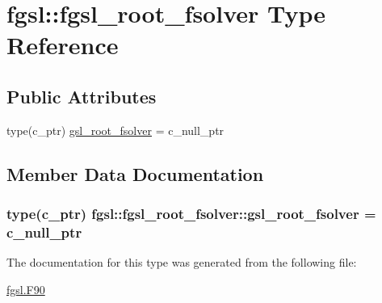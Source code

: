 \hypertarget{structfgsl_1_1fgsl__root__fsolver}{}\section{fgsl\+:\+:fgsl\+\_\+root\+\_\+fsolver Type Reference}
\label{structfgsl_1_1fgsl__root__fsolver}
\subsection*{Public Attributes}
\begin{DoxyCompactItemize}
\item 
type(c\+\_\+ptr) \hyperlink{structfgsl_1_1fgsl__root__fsolver_a04d9a849618a8431b1b923968121a023}{gsl\+\_\+root\+\_\+fsolver} = c\+\_\+null\+\_\+ptr
\end{DoxyCompactItemize}


\subsection{Member Data Documentation}
\hypertarget{structfgsl_1_1fgsl__root__fsolver_a04d9a849618a8431b1b923968121a023}{}
\subsubsection[{gsl\+\_\+root\+\_\+fsolver}]{\setlength{\rightskip}{0pt plus 5cm}type(c\+\_\+ptr) fgsl\+::fgsl\+\_\+root\+\_\+fsolver\+::gsl\+\_\+root\+\_\+fsolver = c\+\_\+null\+\_\+ptr}\label{structfgsl_1_1fgsl__root__fsolver_a04d9a849618a8431b1b923968121a023}


The documentation for this type was generated from the following file\+:\begin{DoxyCompactItemize}
\item 
\hyperlink{fgsl_8F90}{fgsl.\+F90}\end{DoxyCompactItemize}
